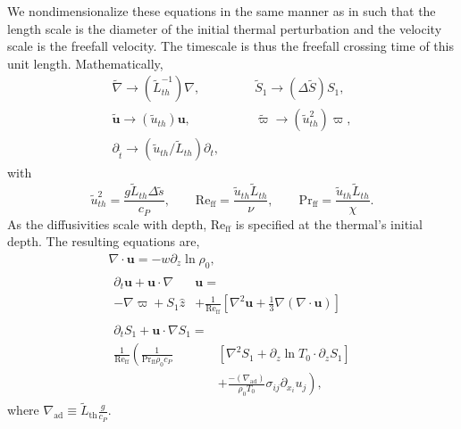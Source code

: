 \documentclass[twocolumn, amsmath, amsfonts, amssymb, trackchanges]{aastex62}
\newcommand{\DivU}{\ensuremath{\nabla\cdot\bm{u}}}
\newcommand{\td}[1]{\ensuremath{\widetilde{#1}}}
\newcommand{\grad}{\ensuremath{\nabla}}
\begin{document}
We nondimensionalize these equations in the same manner as in
\citet{lecoanet&jeevanjee2018} such that
the length scale is the diameter of the initial thermal perturbation
and the velocity scale is the freefall velocity. The timescale is thus
the freefall crossing time of this unit length. Mathematically,
\begin{equation}
\begin{split}
\td{\grad}\rightarrow(\td{L}_{th}^{-1})\grad, \qquad&
\td{S}_1 \rightarrow(\Delta\td{S})S_1,\\
\td{\bm{u}} \rightarrow (\td{u}_{th})\bm{u}, \qquad&
\td{\varpi} \rightarrow (\td{u}_{th}^2)\varpi,\\
\partial_{\tilde{t}} \rightarrow (\td{u}_{th}/\td{L}_{th})\partial_t,\qquad&
\end{split}
\end{equation}
with
\begin{equation}
\tilde{u}_{th}^2 = \frac{g \tilde{L}_{th} \Delta \tilde{s}}{c_P}, \qquad
\text{Re}_{\text{ff}} = \frac{\tilde{u}_{th} \tilde{L}_{th}}{\nu}, \qquad
\text{Pr}_{\text{ff}} = \frac{\tilde{u}_{th} \tilde{L}_{th}}{\chi}.
\end{equation}
As the diffusivities scale with depth, Re$_{\text{ff}}$ is specified at the
thermal's initial depth.
The resulting equations are,
\begin{gather}
\DivU = -w \partial_z \ln\rho_0, \\
\begin{split}
\partial_t \bm{u} + \bm{u}\cdot\grad&\bm{u} = \\
- \grad \varpi + S_1\hat{z} &
+ \frac{1}{\text{Re}_{\text{ff}}}\left[\grad^2 \bm{u} + \frac{1}{3}\grad(\DivU)\right] 
\end{split}\\
\begin{split}
\partial_t S_1 + \bm{u}\cdot\grad S_1 =& \\
\frac{1}{\text{Re}_{\text{ff}}}\left(\frac{1}{\text{Pr}_{\text{ff}}\rho_0c_P }\right.&[\grad^2 S_1 + \partial_z\ln T_0 \cdot\partial_z S_1]\\
&+ \left.\frac{-(\grad_{\text{ad}})}{\rho_0 T_0}\sigma_{ij}\partial_{x_i}u_j \right),
\end{split}
\end{gather}
where $\grad_{\text{ad}} \equiv \tilde{L}_{\text{th}} \frac{g}{c_P}$. 
\end{document}
